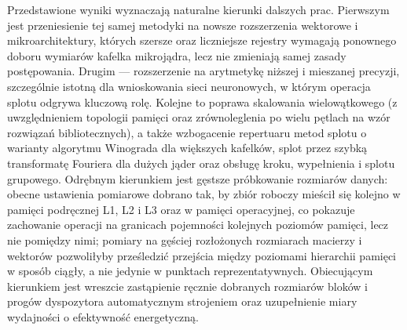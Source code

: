\documentclass[a4paper,12pt]{book} %
\begin{document}
Przedstawione wyniki wyznaczają naturalne kierunki dalszych prac. Pierwszym jest przeniesienie tej samej metodyki na nowsze rozszerzenia wektorowe i mikroarchitektury, których szersze oraz liczniejsze rejestry wymagają ponownego doboru wymiarów kafelka mikrojądra, lecz nie zmieniają samej zasady postępowania. Drugim --- rozszerzenie na arytmetykę niższej i mieszanej precyzji, szczególnie istotną dla wnioskowania sieci neuronowych, w którym operacja splotu odgrywa kluczową rolę. Kolejne to poprawa skalowania wielowątkowego (z uwzględnieniem topologii pamięci oraz zrównoleglenia po wielu pętlach na wzór rozwiązań bibliotecznych), a także wzbogacenie repertuaru metod splotu o warianty algorytmu Winograda dla większych kafelków, splot przez szybką transformatę Fouriera dla dużych jąder oraz obsługę kroku, wypełnienia i splotu grupowego. Odrębnym kierunkiem jest gęstsze próbkowanie rozmiarów danych: obecne ustawienia pomiarowe dobrano tak, by zbiór roboczy mieścił się kolejno w pamięci podręcznej L1, L2 i L3 oraz w pamięci operacyjnej, co pokazuje zachowanie operacji na granicach pojemności kolejnych poziomów pamięci, lecz nie pomiędzy nimi; pomiary na gęściej rozłożonych rozmiarach macierzy i wektorów pozwoliłyby prześledzić przejścia między poziomami hierarchii pamięci w sposób ciągły, a nie jedynie w punktach reprezentatywnych. Obiecującym kierunkiem jest wreszcie zastąpienie ręcznie dobranych rozmiarów bloków i progów dyspozytora automatycznym strojeniem oraz uzupełnienie miary wydajności o efektywność energetyczną.

\cleardoublepage
{}
\renewcommand{\lstlistlistingname}{Spis listingów}
\lstlistoflistings{}

\cleardoublepage
{}
\listoftables{}

\cleardoublepage
{}
\listoffigures{}

\cleardoublepage
{} %
\label{sec:bibliografia}

\end{document}
